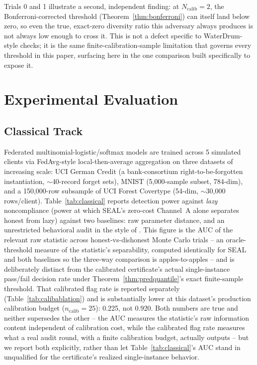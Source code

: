 \documentclass[10pt,journal,compsoc]{IEEEtran}
\begin{document}
Trials 0 and 1 illustrate a second, independent finding: at $N_{\text{calib}}=2$, the Bonferroni-corrected threshold (Theorem~\ref{thm:bonferroni}) can itself land below zero, so even the true, exact-zero diversity ratio this adversary always produces is not always low enough to cross it. This is not a defect specific to WaterDrum-style checks; it is the same finite-calibration-sample limitation that governs every threshold in this paper, surfacing here in the one comparison built specifically to expose it.

\section{Experimental Evaluation}
\label{sec:experiments}

\subsection{Classical Track}

Federated multinomial-logistic/softmax models are trained across 5 simulated clients via FedAvg-style local-then-average aggregation \cite{mcmahan2017fedavg} on three datasets of increasing scale: UCI German Credit \cite{uci_credit_g} (a bank-consortium right-to-be-forgotten instantiation, $\sim$40-record forget sets), MNIST \cite{lecun1998mnist} (5{,}000-sample subset, 784-dim), and a 150{,}000-row subsample of UCI Forest Covertype \cite{uci_covertype} (54-dim, $\sim$30{,}000 rows/client). Table~\ref{tab:classical} reports detection power against \emph{lazy} noncompliance (power at which SEAL's zero-cost Channel~A alone separates honest from lazy) against two baselines: raw parameter distance, and an unrestricted behavioral audit in the style of \cite{tang2026geometric}. This figure is the AUC of the relevant raw statistic across honest-vs-dishonest Monte Carlo trials -- an oracle-threshold measure of the statistic's separability, computed identically for SEAL and both baselines so the three-way comparison is apples-to-apples -- and is deliberately distinct from the calibrated certificate's actual single-instance pass/fail decision rate under Theorem~\ref{thm:predquantile}'s exact finite-sample threshold. That calibrated flag rate is reported separately (Table~\ref{tab:calibablation}) and is substantially lower at this dataset's production calibration budget ($n_{\text{calib}}=25$): 0.225, not 0.920. Both numbers are true and neither supersedes the other -- the AUC measures the statistic's raw information content independent of calibration cost, while the calibrated flag rate measures what a real audit round, with a finite calibration budget, actually outputs -- but we report both explicitly, rather than let Table~\ref{tab:classical}'s AUC stand in unqualified for the certificate's realized single-instance behavior.
\end{document}
